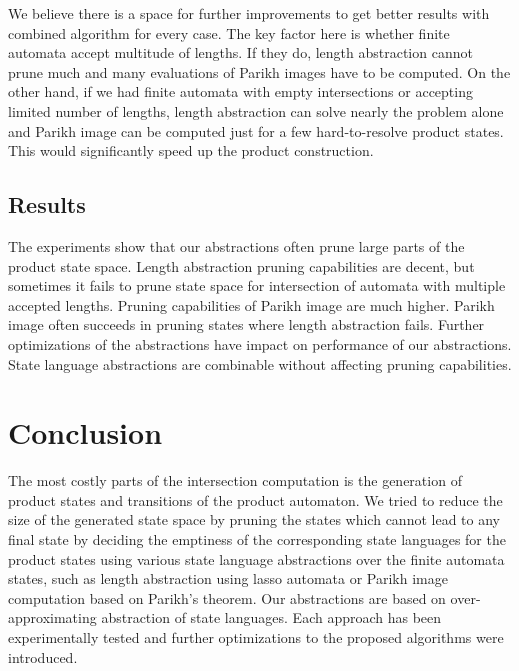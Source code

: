 We believe there is a space for further improvements to get better results with combined algorithm for every case. The key factor here is whether finite automata accept multitude of lengths. If they do, length abstraction cannot prune much and many evaluations of Parikh images have to be computed. On the other hand, if we had finite automata with empty intersections or accepting limited number of lengths, length abstraction can solve nearly the problem alone and Parikh image can be computed just for a few hard-to-resolve product states. This would significantly speed up the product construction.

\section{Results}


The experiments show that our abstractions often prune large parts of the product state space. Length abstraction pruning capabilities are decent, but sometimes it fails to prune state space for intersection of automata with multiple accepted lengths. Pruning capabilities of Parikh image are much higher. Parikh image often succeeds in pruning states where length abstraction fails. Further optimizations of the abstractions have impact on performance of our abstractions. State language abstractions are combinable without affecting pruning capabilities.

\chapter{Conclusion}

The most costly parts of the intersection computation is the generation of product states and transitions of the product automaton. We tried to reduce the size of the generated state space by pruning the states which cannot lead to any final state by deciding the emptiness of the corresponding state languages for the product states using various state language abstractions over the finite automata states, such as length abstraction using lasso automata or Parikh image computation based on Parikh's theorem. Our abstractions are based on over-approximating abstraction of state languages. Each approach has been experimentally tested and further optimizations to the proposed algorithms were introduced.

